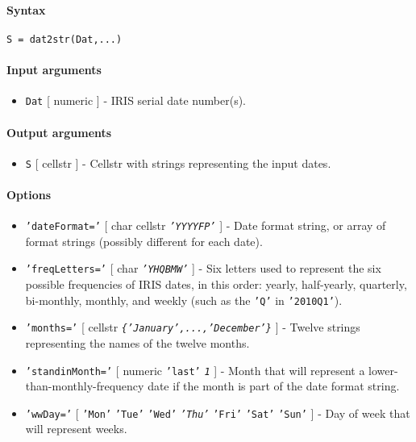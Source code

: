 


	\paragraph{Syntax}

\begin{verbatim}
S = dat2str(Dat,...)
\end{verbatim}

\paragraph{Input arguments}

\begin{itemize}
\itemsep1pt\parskip0pt
\item
  \texttt{Dat} {[} numeric {]} - IRIS serial date number(s).
\end{itemize}

\paragraph{Output arguments}

\begin{itemize}
\itemsep1pt\parskip0pt
\item
  \texttt{S} {[} cellstr {]} - Cellstr with strings representing the
  input dates.
\end{itemize}

\paragraph{Options}

\begin{itemize}
\item
  \texttt{'dateFormat='} {[} char \textbar{} cellstr \textbar{}
  \emph{\texttt{'YYYYFP'}} {]} - Date format string, or array of format
  strings (possibly different for each date).
\item
  \texttt{'freqLetters='} {[} char \textbar{} \emph{\texttt{'YHQBMW'}}
  {]} - Six letters used to represent the six possible frequencies of
  IRIS dates, in this order: yearly, half-yearly, quarterly, bi-monthly,
  monthly, and weekly (such as the \texttt{'Q'} in \texttt{'2010Q1'}).
\item
  \texttt{'months='} {[} cellstr \textbar{}
  \emph{\texttt{\{'January',...,'December'\}}} {]} - Twelve strings
  representing the names of the twelve months.
\item
  \texttt{'standinMonth='} {[} numeric \textbar{} \texttt{'last'}
  \textbar{} \emph{\texttt{1}} {]} - Month that will represent a
  lower-than-monthly-frequency date if the month is part of the date
  format string.
\item
  \texttt{'wwDay='} {[} \texttt{'Mon'} \textbar{} \texttt{'Tue'}
  \textbar{} \texttt{'Wed'} \textbar{} \emph{\texttt{'Thu'}} \textbar{}
  \texttt{'Fri'} \textbar{} \texttt{'Sat'} \textbar{} \texttt{'Sun'} {]}
  - Day of week that will represent weeks.
\end{itemize}


